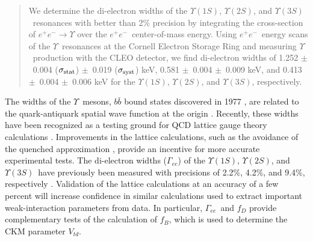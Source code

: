 \documentclass[aps,prl,twocolumn,superscriptaddress,showpacs,floatfix]{revtex4}
\begin{document}

\date{December 21, 2005}

\newcommand{\gee}{$\Gamma_{ee}$}
\newcommand{\ups}{$\Upsilon$}
\newcommand{\us}{$\Upsilon(1S)$}
\newcommand{\uss}{$\Upsilon(2S)$}
\newcommand{\usss}{$\Upsilon(3S)$}
\newcommand{\ee}{$e^+e^-$}
\newcommand{\mm}{$\mu^+\mu^-$}
\newcommand{\tautau}{$\tau^+\tau^-$}
\newcommand{\ellell}{$\ell^+\ell^-$}
\newcommand{\pipi}{$\pi^+\pi^-$}
\newcommand{\PM}{$\pm$}
\newcommand{\inv}{$^{-1}$}
\newcommand{\bmm}{${\mathcal B}_{\mu\mu}$}
\newcommand{\btt}{${\mathcal B}_{\tau\tau}$}
\newcommand{\geehadtot}{\Gamma_{ee}\Gamma_{\mbox{\scriptsize had}}/\Gamma_{\mbox{\scriptsize tot}}}
\newcommand{\pvis}{P_{\mbox{\scriptsize vis}}}
\newcommand{\ppass}{P_{\mbox{\scriptsize pass given vis}}}
\newcommand{\ehtrig}{\epsilon_{\mbox{\scriptsize htrig}}}
\newcommand{\ecuts}{\epsilon_{\mbox{\scriptsize cuts}}}
\newcommand{\chired}{\chi^2_{\mbox{\scriptsize red}}}

\begin{abstract} 
We determine the di-electron widths of the \us, \uss, and \usss\
resonances with better than 2\% precision by integrating the
cross-section of $e^+e^- \to \Upsilon$ over the \ee\ center-of-mass
energy.  Using \ee\ energy scans of the \ups\ resonances at the
Cornell Electron Storage Ring and measuring \ups\ production with the
CLEO detector, we find di-electron widths of
%
1.252 \PM\ 0.004 ($\sigma_{\mbox{\scriptsize stat}}$) \PM\ 0.019 ($\sigma_{\mbox{\scriptsize syst}}$) keV,
0.581 \PM\ 0.004 \PM\ 0.009 keV, and
0.413 \PM\ 0.004 \PM\ 0.006 keV for the \us, \uss, and \usss,
respectively.
\end{abstract}

\maketitle

The widths of the \ups\ mesons, $b\bar{b}$ bound states discovered in
1977 \cite{discovery}, are related to the quark-antiquark spatial wave
function at the origin \cite{wavefunction}.  Recently, these widths
have been recognized as a testing ground for QCD lattice gauge theory
calculations \cite{lattice}.  Improvements in the lattice
calculations, such as the avoidance of the quenched approximation
\cite{unquenched}, provide an incentive for more accurate experimental
tests.  The di-electron widths (\gee) of the \us, \uss, and \usss\
have previously been measured with precisions of 2.2\%, 4.2\%, and
9.4\%, respectively \cite{pdg}.  Validation of the lattice
calculations at an accuracy of a few percent will increase confidence
in similar calculations used to extract important weak-interaction
parameters from data.  In particular, \gee\ and $f_D$ \cite{fd}
provide complementary tests of the calculation of $f_B$, which is used
to determine the CKM parameter $V_{td}$.
\end{document}
